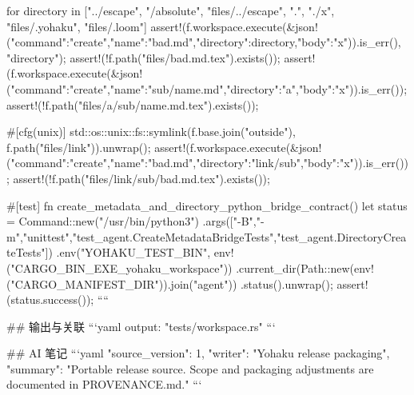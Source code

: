 {    for directory in ["../escape", "/absolute", "files/../escape", ".", "./x", "files/.yohaku", "files/.loom"] {
        assert!(f.workspace.execute(&json!({"command":"create","name":"bad.md","directory":directory,"body":"x"})).is_err(), "{directory}");
        assert!(!f.path("files/bad.md.tex").exists());
    }
    assert!(f.workspace.execute(&json!({"command":"create","name":"sub/name.md","directory":"a","body":"x"})).is_err());
    assert!(!f.path("files/a/sub/name.md.tex").exists());

    #[cfg(unix)]
    {
        std::os::unix::fs::symlink(f.base.join("outside"), f.path("files/link")).unwrap();
        assert!(f.workspace.execute(&json!({"command":"create","name":"bad.md","directory":"link/sub","body":"x"})).is_err());
        assert!(!f.path("files/link/sub/bad.md.tex").exists());
    }
}

#[test]
fn create_metadata_and_directory_python_bridge_contract() {
    let status = Command::new("/usr/bin/python3")
        .args(["-B","-m","unittest","test_agent.CreateMetadataBridgeTests","test_agent.DirectoryCreateTests"])
        .env("YOHAKU_TEST_BIN", env!("CARGO_BIN_EXE_yohaku_workspace"))
        .current_dir(Path::new(env!("CARGO_MANIFEST_DIR")).join("agent"))
        .status().unwrap();
    assert!(status.success());
}
````

## 输出与关联
```yaml
output: "tests/workspace.rs"
```

## AI 笔记
```yaml
{"source_version": 1, "writer": "Yohaku release packaging", "summary": "Portable release source. Scope and packaging adjustments are documented in PROVENANCE.md."}
```
